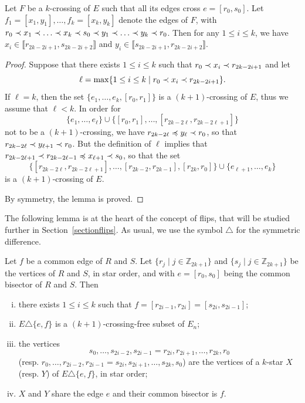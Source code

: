 \documentclass[12pt]{amsart}
\begin{document}
\begin{lemma}\label{sandwich}
Let $F$ be a $k$-crossing of $E$ such that all its edges cross $e=[r_0,s_0]$. Let $f_1=[x_1,y_1],\ldots,f_k=[x_k,y_k]$ denote the edges of $F$, with $r_0\prec x_1\prec \ldots\prec x_k\prec s_0\prec y_1\prec \ldots\prec y_k\prec r_0$.
Then for any $1\le i\le k$, we have $x_i\in\llbracket r_{2k-2i+1},s_{2k-2i+2}\rrbracket$ and $y_i\in\llbracket s_{2k-2i+1},r_{2k-2i+2}\rrbracket$.
\end{lemma}

\begin{proof}
Suppose that there exists $1\le i\le k$ such that $r_0\prec x_i\prec r_{2k-2i+1}$ and let
$$\ell=\max\{1\le i\le k \;|\; r_0\prec x_i\prec r_{2k-2i+1}\}.$$
If $\ell=k$, then the set $\{e_1,\ldots,e_k,[r_0,r_1]\}$ is a $(k+1)$-crossing of $E$, thus we assume that $\ell<k$. In order for $$\{e_1,\ldots,e_\ell\}\cup\{[r_0,r_1],\ldots,[r_{2k-2\ell},r_{2k-2\ell+1}]\}$$ not to be a $(k+1)$-crossing, we have $r_{2k-2\ell}\preccurlyeq y_\ell\prec r_0$, so that $r_{2k-2\ell}\prec y_{\ell+1}\prec r_0$. But the definition of $\ell$ implies that $r_{2k-2\ell+1}\prec r_{2k-2\ell-1}\preccurlyeq x_{\ell+1}\prec s_0$, so that
the set $$\{[r_{2k-2\ell},r_{2k-2\ell+1}],\ldots,[r_{2k-2},r_{2k-1}],[r_{2k},r_0]\}\cup\{e_{\ell+1},\ldots,e_k\}$$ is a $(k+1)$-crossing of $E$.

By symmetry, the lemma is proved.
\end{proof}

The following lemma is at the heart of the concept of flips, that will be studied further in Section~\ref{sectionflips}. As usual, we use the symbol $\triangle$ for the symmetric difference.

\begin{lemma}\label{commonedge}
Let $f$ be a common edge of $R$ and $S$. 
Let $\{r_j\;|\; j\in\mathbb{Z}_{2k+1}\}$ and $\{s_j\;|\; j\in\mathbb{Z}_{2k+1}\}$ be the vertices of $R$ and $S$, in star order, and with $e=[r_0,s_0]$ being the common bisector of $R$ and $S$.
Then
\begin{enumerate}[(i)]
\item there exists $1\le i\le k$ such that $f=[r_{2i-1},r_{2i}]=[s_{2i},s_{2i-1}]$;
\item $E\triangle\{e,f\}$ is a $(k+1)$-crossing-free subset of $E_n$;
\item the vertices $$s_0,\ldots,s_{2i-2},s_{2i-1}=r_{2i},r_{2i+1},\ldots,r_{2k},r_0$$
(resp. $r_0,\ldots,r_{2i-2},r_{2i-1}=s_{2i},s_{2i+1},\ldots,s_{2k},s_0$) are the vertices of a $k$-star $X$ (resp. $Y$) of $E\triangle\{e,f\}$, in star order;
\item $X$ and $Y$ share the edge $e$ and their common bisector is $f$.
\end{enumerate}
\end{lemma}
\end{document}
